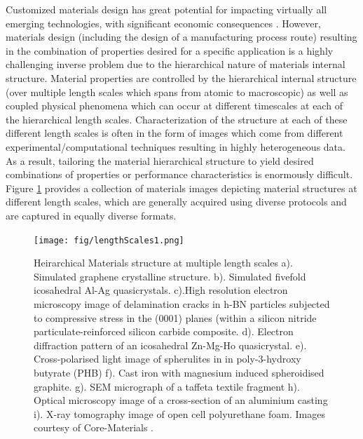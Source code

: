 \documentclass{bmcart}
\begin{document}
Customized materials design has great potential for impacting virtually all emerging technologies, with significant economic consequences \cite{ward2012materials, allison2006integrated, MGIwhite, MGI2014, allison2011integrated, olson2000designing, national2008integrated, schmitz2012integrative, robinson2013tms, allisonintegrated, TMSfieldstudy}. However, materials design (including the design of a manufacturing process route) resulting in the combination of properties desired for a specific application is a highly challenging inverse problem due to the hierarchical nature of materials internal structure. Material properties are controlled by the hierarchical internal structure (over multiple length scales which spans from atomic to macroscopic) as well as coupled physical phenomena which can occur at different timescales at each of the hierarchical length scales. Characterization of the structure at each of these different length scales is often in the form of images which come from different experimental/computational techniques resulting in highly heterogeneous data. As a result, tailoring the material hierarchical structure to yield desired combinations of properties or performance characteristics is enormously difficult. Figure \ref{fig:length_scales} provides a collection of materials images depicting material structures at different length scales, which are generally acquired using diverse protocols and are captured in equally diverse formats.

\begin{figure}
    \texttt{[image: fig/lengthScales1.png]}
    \caption{Heirarchical Materials structure at multiple length scales
      a). Simulated graphene crystalline structure. b). Simulated fivefold icosahedral Al-Ag quasicrystals. c).High resolution electron microscopy image of delamination cracks in h-BN particles subjected to compressive stress in the (0001) planes (within a silicon nitride particulate-reinforced silicon carbide composite. d). Electron diffraction pattern of an icosahedral Zn-Mg-Ho quasicrystal. e). Cross-polarised light image of spherulites in in poly-3-hydroxy butyrate (PHB) f). Cast iron with magnesium induced spheroidised graphite. g). SEM micrograph of a taffeta textile fragment h). Optical microscopy image of a cross-section of an aluminium casting  i). X-ray tomography image of open cell polyurethane foam. Images courtesy of Core-Materials \cite{coreMaterials}.}
  \label{fig:length_scales}
\end{figure}
\end{document}
